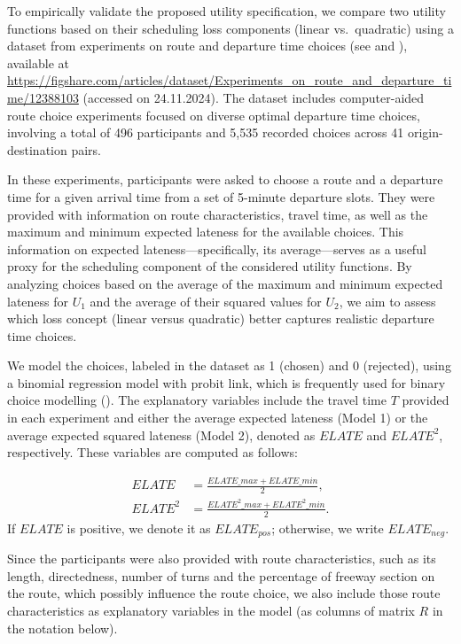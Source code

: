 \documentclass[preprint, 3p, authoryear]{elsarticle} %
\theoremstyle{definition}
\theoremstyle{definition}
\theoremstyle{definition}
\theoremstyle{definition}
\theoremstyle{remark}
\begin{document}
To empirically validate the proposed utility specification, we compare two utility functions based on their scheduling loss components (linear vs.~quadratic) using a dataset from experiments on route and departure time choices (see \citet{Gonzalez2020} and \citet{GONZALEZRAMIREZ2021}), available at \url{https://figshare.com/articles/dataset/Experiments_on_route_and_departure_time/12388103} (accessed on 24.11.2024). The dataset includes computer-aided route choice experiments focused on diverse optimal departure time choices, involving a total of 496 participants and 5,535 recorded choices across 41 origin-destination pairs.

In these experiments, participants were asked to choose a route and a departure time for a given arrival time from a set of 5-minute departure slots. They were provided with information on route characteristics, travel time, as well as the maximum and minimum expected lateness for the available choices. This information on expected lateness---specifically, its average---serves as a useful proxy for the scheduling component of the considered utility functions. By analyzing choices based on the average of the maximum and minimum expected lateness for \(U_1\) and the average of their squared values for \(U_2\), we aim to assess which loss concept (linear versus quadratic) better captures realistic departure time choices.

We model the choices, labeled in the dataset as 1 (chosen) and 0 (rejected), using a binomial regression model with probit link, which is frequently used for binary choice modelling (\citet{ben1985discrete}). The explanatory variables include the travel time \(T\) provided in each experiment and either the average expected lateness (Model 1) or the average expected squared lateness (Model 2), denoted as \(ELATE\) and \(ELATE^2\), respectively. These variables are computed as follows:

\begin{align}ELATE &= \frac{ELATE\_max + ELATE\_min}2,\\
ELATE^2 &= \frac{ELATE^2\_max + ELATE^2\_min}2.
\end{align}
If \(ELATE\) is positive, we denote it as \(ELATE_{pos}\); otherwise, we write \(ELATE_{neg}\).

Since the participants were also provided with route characteristics, such as its length, directedness, number of turns and the percentage of freeway section on the route, which possibly influence the route choice, we also include those route characteristics as explanatory variables in the model (as columns of matrix \(R\) in the notation below).
\end{document}
